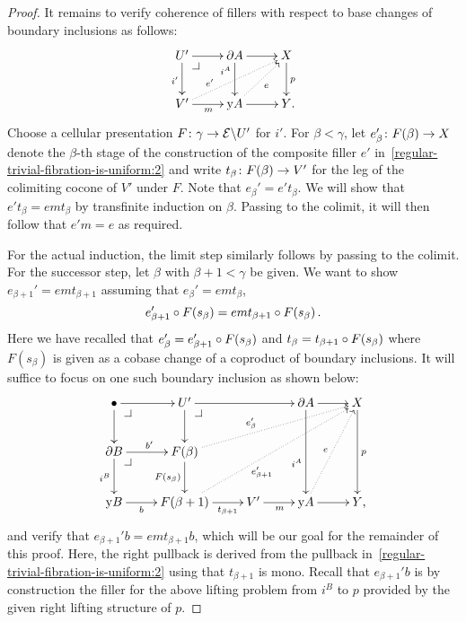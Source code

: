 \documentclass[reqno,10pt,a4paper,oneside,draft]{amsart}
\begin{document}
\begin{proof}
It remains to verify coherence of fillers with respect to base changes of boundary inclusions as follows:
\begin{equation} \label{regular-trivial-fibration-is-uniform:2}
\xycenter{
  U'
  \ar[d]_{i'}
  \ar[r]
  \pullback{dr}
&
  \partial A
  \ar[d]_(0.3){i^A}
  \ar[r]
&
  X
  \ar[d]^{p}
\\
  V'
  \ar[r]_{m}
  \ar@{.>}[urr]^(0.3){e'}
&
  \yon A
  \ar[r]
  \ar@{.>}[ur]_{e}
&
  Y
\rlap{.}}
\end{equation}
Choose a cellular presentation $F \colon \gamma \to \mathcal{E} \backslash U'$ for $i'$.
For $\beta < \gamma$, let $e_{\beta}' \colon F(\beta) \to X$ denote the $\beta$-th stage of the construction of the composite filler $e'$ in~\eqref{regular-trivial-fibration-is-uniform:2} and write $t_{\beta} \colon F(\beta) \to V'$ for the leg of the colimiting cocone of $V'$ under $F$.
Note that $e_{\beta}' = e' t_{\beta}$.
We will show that $e' t_{\beta} = e m t_{\beta}$ by transfinite induction on $\beta$.
Passing to the colimit, it will then follow that $e' m = e$ as required.

For the actual induction, the limit step similarly follows by passing to the colimit.
For the successor step, let $\beta$ with $\beta + 1 < \gamma$ be given.
We want to show $e_{\beta+1}' = e m t_{\beta+1}$ assuming that $e_{\beta}' = e m t_{\beta}$, \ie
\begin{equation} \label{regular-trivial-fibration-is-uniform:ih}
  e_{\beta+1}' \mathbin{\circ} F(s_{\beta}) = e m t_{\beta+1} \mathbin{\circ} F(s_{\beta}) \, .
\end{equation}
Here we have recalled that $e_{\beta}' = e_{\beta+1}' \mathbin{\circ} F(s_{\beta})$ and $t_{\beta} = t_{\beta+1} \mathbin{\circ} F(s_{\beta})$ where $F(s_{\beta})$ is given as a cobase change of a coproduct of boundary inclusions.
It will suffice to focus on one such boundary inclusion as shown below:
\begin{equation} \label{regular-trivial-fibration-is-uniform:3}
\xycenter{
  \bullet
  \ar[r]
  \ar[d]
  \pullback{dr}
&
  U'
  \ar[rr]
  \ar[d]
  \pullback{dr}
&&
  \partial A
  \ar[r]
  \ar[dd]_(0.6){i^A}
&
  X
  \ar[dd]^{p}
\\
  \partial B
  \ar[r]^{b'}
  \ar[d]_{i^B}
  \pullback{dr}
&
  F(\beta)
  \ar[d]_{F(s_{\beta})}
  \ar@{.>}[urrr]^(0.4){e_{\beta}'}
\\
  \yon B
  \ar[r]_-{b}
&
  F(\beta+1)
  \ar[r]_-{t_{\beta+1}}
  \ar@{.>}[uurrr]_(0.4){e_{\beta+1}'}
&
  V'
  \ar[r]_{m}
&
  \yon A
  \ar[r]
  \ar@{.>}[uur]^{e}
&
  Y
\rlap{,}}
\end{equation}
and verify that $e_{\beta+1}' b = e m t_{\beta+1} b$, which will be our goal for the remainder of this proof.
Here, the right pullback is derived from the pullback in~\eqref{regular-trivial-fibration-is-uniform:2} using that $t_{\beta+1}$ is mono.
Recall that $e_{\beta+1}' b$ is by construction the filler for the above lifting problem from $i^B$ to $p$ provided by the given right lifting structure of $p$.


\end{proof}
\end{document}
